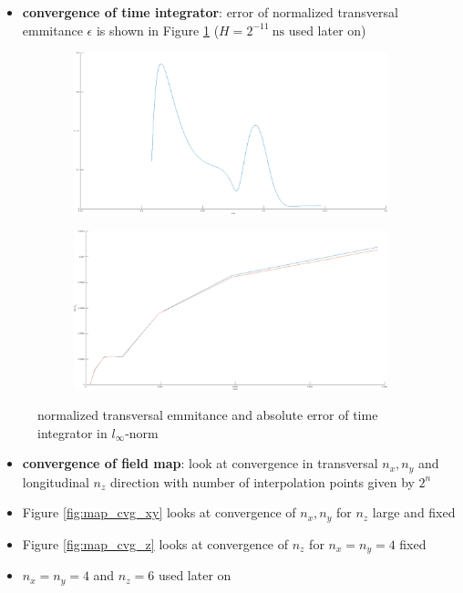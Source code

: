 \begin{itemize}
   \item \textbf{convergence of time integrator}: error of normalized transversal emmitance $\epsilon$ is shown in Figure \ref{fig:int_cvg} ($H=2^{-11}\ \mathrm{ns}$ used later on)\\
\end{itemize}

\begin{center}
\begin{figure}[H]
   \begin{subfigure}{0.45\textwidth}
      \includegraphics[width=\textwidth]{fig/int_emit}
   \end{subfigure}
   \begin{subfigure}{0.45\textwidth}
      \includegraphics[width=\textwidth]{fig/int_cvg}
   \end{subfigure}
   \caption{normalized transversal emmitance and absolute error of time integrator in $l_\infty$-norm}
   \label{fig:int_cvg}
\end{figure}
\end{center}

\begin{itemize}
   \item \textbf{convergence of field map}: look at convergence in transversal $n_x, n_y$ and longitudinal $n_z$ direction with number of interpolation points given by $2^n$
   \item Figure \ref{fig:map_cvg_xy} looks at convergence of $n_x, n_y$ for $n_z$ large and fixed
   \item Figure \ref{fig:map_cvg_z} looks at convergence of $n_z$ for $n_x=n_y=4$ fixed
   \item $n_x=n_y=4$ and $n_z=6$ used later on
\end{itemize}

